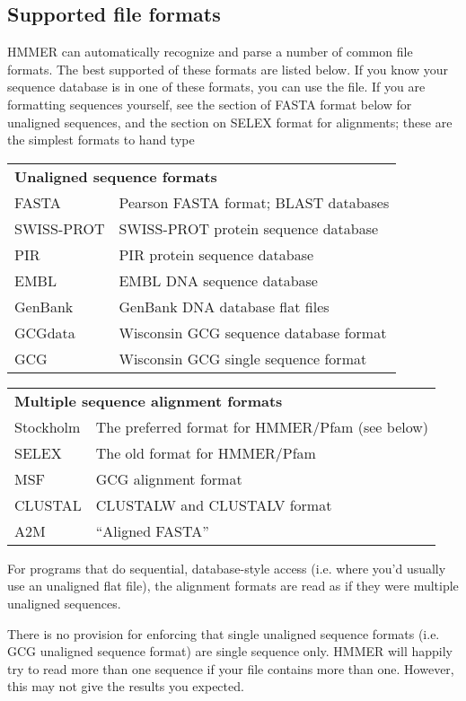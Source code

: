 \subsection{Supported file formats}
 
HMMER can automatically recognize and parse a number of common file
formats. The best supported of these formats are listed below. If you
know your sequence database is in one of these formats, you can use
the file. If you are formatting sequences yourself, see the section of
FASTA format below for unaligned sequences, and the section on SELEX
format for alignments; these are the simplest formats to hand type


\begin{tabular}{ll}
\multicolumn{2}{l}{\textbf{Unaligned sequence formats}} \\
FASTA      & Pearson FASTA format; BLAST databases \\
SWISS-PROT & SWISS-PROT protein sequence database\\ 
PIR        & PIR protein sequence database \\
EMBL       & EMBL DNA sequence database \\
GenBank    & GenBank DNA database flat files\\
GCGdata    & Wisconsin GCG sequence database format \\
GCG        & Wisconsin GCG single sequence format \\
\end{tabular}

\begin{tabular}{ll}
\multicolumn{2}{l}{\textbf{Multiple sequence alignment formats}}\\
Stockholm & The preferred format for HMMER/Pfam (see below)\\
SELEX     & The old format for HMMER/Pfam\\
MSF     &   GCG alignment format \\
CLUSTAL &   CLUSTALW and CLUSTALV format \\
A2M     &   ``Aligned FASTA'' \\ 
\end{tabular}

For programs that do sequential, database-style access (i.e.  where
you'd usually use an unaligned flat file), the alignment formats are
read as if they were multiple unaligned sequences.

There is no provision for enforcing that single unaligned sequence
formats (i.e. GCG unaligned sequence format) are single sequence
only. HMMER will happily try to read more than one sequence if your
file contains more than one. However, this may not give the results
you expected.

